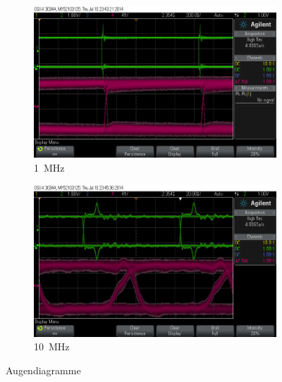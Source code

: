 \documentclass[12pt,a4paper]{article}
\begin{document}
\begin{figure}[H]
  \centering
  \begin{subfigure}[b]{0.6\textwidth}
    \includegraphics[width=\textwidth]{../measurements/20140710/eye_plots/01MHz.png}
    \caption{\SI{1}{\mega\hertz}}
  \end{subfigure}  
  \begin{subfigure}[b]{0.6\textwidth}
    \includegraphics[width=\textwidth]{../measurements/20140710/eye_plots/10MHz.png}
    \caption{\SI{10}{\mega\hertz}}
  \end{subfigure}  
  \caption{Augendiagramme}
  \label{fig:eye_plots_slow}
\end{figure}
\end{document}
